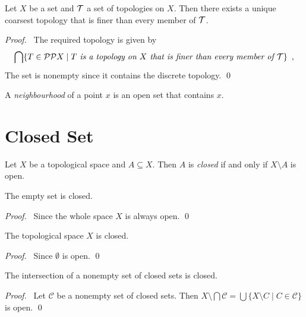 \begin{lemma}
    Let $X$ be a set and $\mathcal{T}$ a set of topologies on $X$. Then there exists a unique coarsest topology
    that is finer than every member of $\mathcal{T}$.
\end{lemma}

\begin{proof}
    \pf\ The required topology is given by
    \[ \bigcap \{ T \in \mathcal{P} \mathcal{P} X \mid T \emph{ is a topology on $X$ that is
    finer than every member of $\mathcal{T}$} \} \enspace , \] 
    The set is nonempty since it contains the discrete topology. \qed
\end{proof}

\begin{definition}[Neighbourhood]
    A \emph{neighbourhood} of a point $x$ is an open set that contains $x$.
\end{definition}

\section{Closed Set}

\begin{definition}
    Let $X$ be a topological space and $A \subseteq X$. Then $A$ is \emph{closed} if and only if $X \setminus
    A$ is open.
\end{definition}

\begin{lemma}
    The empty set is closed.
\end{lemma}

\begin{proof}
    \pf\ Since the whole space $X$ is always open. \qed
\end{proof}

\begin{lemma}
    \label{lemma:closed_whole_set}
    The topological space $X$ is closed.
\end{lemma}

\begin{proof}
    \pf\ Since $\emptyset$ is open. \qed
\end{proof}

\begin{lemma}
    \label{lemma:closed_intersection}
    The intersection of a nonempty set of closed sets is closed.
\end{lemma}

\begin{proof}
    \pf\ Let $\mathcal{C}$ be a nonempty set of closed sets. Then $X \setminus \bigcap \mathcal{C}
    = \bigcup \{ X \setminus C \mid C \in \mathcal{C} \}$ is open. \qed
\end{proof}


